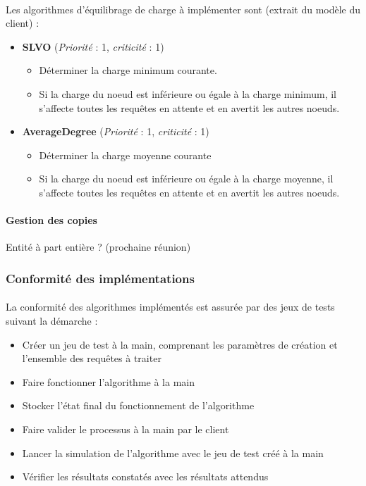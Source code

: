 \documentclass[12pt]{article}
\newcommand{\besoin}[2] {
  (\textit{Priorité} : #1, \textit{criticité} : #2)
}
\begin{document}
\paragraph{} Les algorithmes d'équilibrage de charge à implémenter sont (extrait du modèle du client) :

\begin{itemize}
 \item \textbf{SLVO} \besoin{1}{1} 
 \begin{itemize}
  \item Déterminer la charge minimum courante.
  \item Si la charge du noeud est inférieure ou égale à la charge minimum, il s'affecte toutes les requêtes en attente et en avertit les autres noeuds. \vspace{0.2cm}
 \end{itemize}
 \item \textbf{AverageDegree} \besoin{1}{1} 
 \begin{itemize}
  \item Déterminer la charge moyenne courante
  \item Si la charge du noeud est inférieure ou égale à la charge moyenne, il s'affecte toutes les requêtes en attente et en avertit les autres noeuds.
 \end{itemize}
\end{itemize}

\paragraph{Gestion des copies} Entité à part entière ? (prochaine réunion)


\subsubsection{Conformité des implémentations}

\paragraph{} La conformité des algorithmes implémentés est assurée par des jeux de tests suivant la démarche :

\begin{itemize}
	\item Créer un jeu de test à la main, comprenant les paramètres de création et l'ensemble des requêtes à traiter
	\item Faire fonctionner l'algorithme à la main
	\item Stocker l'état final du fonctionnement de l'algorithme
	\item Faire valider le processus à la main par le client
	\item Lancer la simulation de l'algorithme avec le jeu de test créé à la main
	\item Vérifier les résultats constatés avec les résultats attendus
\end{itemize}
	
\end{document}
